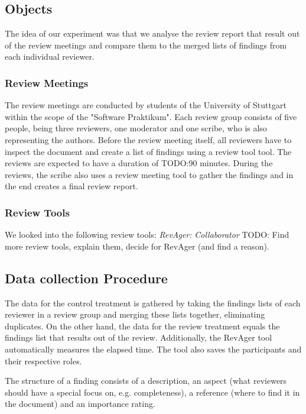\subsection{Objects}

The idea of our experiment was that we analyse the review report that result out of the review meetings and compare them to the merged lists of findings from each individual reviewer.

\subsubsection{Review Meetings}

The review meetings are conducted by students of the University of Stuttgart within the scope of the "Software Praktikum". Each review group consists of five people, being three reviewers, one moderator and one scribe, who is also representing the authors. Before the review meeting itself, all reviewers have to inspect the document and create a list of findings using a review tool \cite{TODO:revager} tool. The reviews are expected to have a duration of TODO:90 minutes. During the reviews, the scribe also uses a review meeting tool to gather the findings and in the end creates a final review report.

\subsubsection{Review Tools}

We looked into the following review tools:
\textit{RevAger:}
\textit{Collaborator}
TODO: Find more review tools, explain them, decide for RevAger (and find a reason).

\subsection{Data collection Procedure}

The data for the control treatment is gathered by taking the findings lists of each reviewer in a review group and merging these lists together, eliminating duplicates.
On the other hand, the data for the review treatment equals the findings list that results out of the review. Additionally, the RevAger tool automatically measures the elapsed time.
The tool also saves the participants and their respective roles.

The structure of a finding consists of a description, an aspect (what reviewers should have a special focus on, e.g. completeness), a reference (where to find it in the document) and an importance rating.

